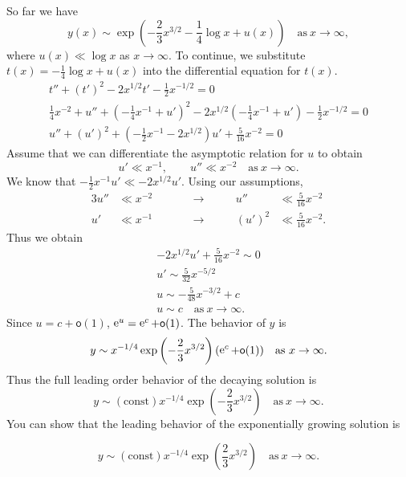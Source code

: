 \begin{Example}
  So far we have
  \[ y(x) \sim \exp \left( -\frac{2}{3} x^{3/2} - \frac{1}{4} \log x + u(x) 
  \right) \quad \mathrm{as}\ x \to \infty, \]
  where $u(x) \ll \log x$ as $x \to \infty$.
  To continue, we substitute $t(x) = -\frac{1}{4} \log x + u(x)$ into the 
  differential equation for $t(x)$.
  \begin{gather*}
    t'' + (t')^2 - 2 x^{1/2} t' - \frac{1}{2} x^{-1/2} = 0 \\
    \frac{1}{4} x^{-2} + u'' + \left(-\frac{1}{4} x^{-1} + u' \right)^2
    - 2 x^{1/2} \left( -\frac{1}{4} x^{-1} + u' \right) 
    -\frac{1}{2} x^{-1/2} = 0 \\
    u'' + (u')^2 + \left( -\frac{1}{2} x^{-1} - 2 x^{1/2} \right) u' 
    + \frac{5}{16} x^{-2} = 0
  \end{gather*}
  Assume that we can differentiate the asymptotic relation for $u$ to obtain
  \[ u' \ll x^{-1}, \qquad u'' \ll x^{-2} \quad \mathrm{as}\ x \to \infty. \]
  We know that $-\frac{1}{2} x^{-1} u' \ll -2 x^{1/2} u'$.  Using
  our assumptions,
  \begin{alignat*}{3}
    u'' &\ll x^{-2} &\qquad &\to &\qquad u'' &\ll \frac{5}{16} x^{-2} \\
    u' &\ll x^{-1} &\qquad &\to &\qquad (u')^2 &\ll \frac{5}{16} x^{-2}.
  \end{alignat*}
  Thus we obtain
  \begin{gather*}
    -2 x^{1/2} u' + \frac{5}{16} x^{-2} \sim 0 \\
    u' \sim \frac{5}{32} x^{-5/2} \\
    u \sim -\frac{5}{48} x^{-3/2} + c \\
    u \sim c \quad \mathrm{as}\ x \to \infty.
  \end{gather*}
  Since $u = c + \mathsf{o}(1)$, $\mathop{\mathrm{e}}\nolimits^u = \mathop{\mathrm{e}}\nolimits^c + \mathsf{o}(1)$.  
  The behavior of $y$ is
  \[ y \sim x^{-1/4} \exp\left(-\frac{2}{3} x^{3/2} \right)(\mathop{\mathrm{e}}\nolimits^c + \mathsf{o}(1))
  \quad \mathrm{as}\ x \to \infty. \]
  Thus the full leading order behavior of the decaying solution is
  \[ \boxed{ y \sim (\mathrm{const})x^{-1/4} \exp\left(-\frac{2}{3} x^{3/2} \right)
    \quad \mathrm{as}\ x \to \infty.} \]
  You can show that the leading behavior of the exponentially growing solution
  is

  \[ y \sim (\mathrm{const})x^{-1/4} \exp\left(\frac{2}{3} x^{3/2} \right)
  \quad \mathrm{as}\ x \to \infty. \]
\end{Example}












